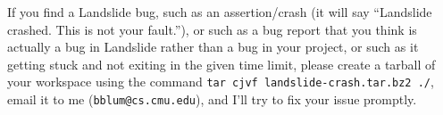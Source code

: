 \documentclass{article}
\begin{document}
 If you find a Landslide bug, such as an assertion/crash (it will say ``Landslide crashed. This is not your fault.''), or such as a
bug report that you think is actually a bug in Landslide rather than a bug in your project, or such as it getting stuck
and not exiting in the given time limit, please create a tarball of your workspace
using the command {\tt tar cjvf landslide-crash.tar.bz2 ./},
email it to me ({\tt bblum@cs.cmu.edu}), and I'll try to fix your issue promptly.
\\
\end{document}
